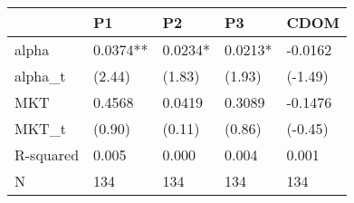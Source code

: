 \begin{tabular}{lllll}
\toprule
 & P1 & P2 & P3 & CDOM \\
\midrule
alpha & 0.0374** & 0.0234* & 0.0213* & -0.0162 \\
alpha_t & (2.44) & (1.83) & (1.93) & (-1.49) \\
MKT & 0.4568 & 0.0419 & 0.3089 & -0.1476 \\
MKT_t & (0.90) & (0.11) & (0.86) & (-0.45) \\
R-squared & 0.005 & 0.000 & 0.004 & 0.001 \\
N & 134 & 134 & 134 & 134 \\
\bottomrule
\end{tabular}
